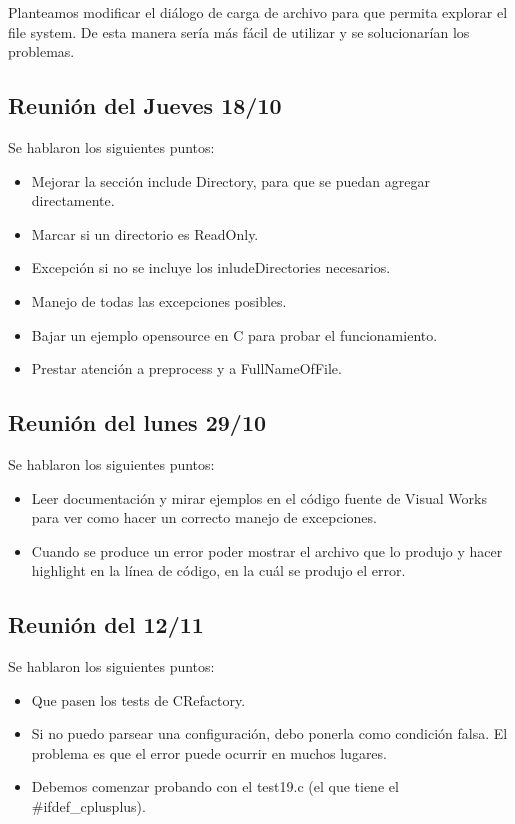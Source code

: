 \documentclass[a4paper,oneside,10pt]{article}
\begin{document}
Planteamos modificar el di\'alogo de carga de archivo para que permita explorar el file system. De esta manera ser\'ia m\'as f\'acil de utilizar y se solucionar\'ian los problemas.

\subsection{Reuni\'on del Jueves 18/10}
Se hablaron los siguientes puntos:
\begin{itemize}
 \item Mejorar la secci\'on include Directory, para que se puedan agregar directamente.
 \item Marcar si un directorio es ReadOnly.
 \item Excepción si no se incluye los inludeDirectories necesarios. 
 \item Manejo de todas las excepciones posibles.
 \item Bajar un ejemplo opensource en C para probar el funcionamiento.
 \item Prestar atenci\'on a preprocess y a FullNameOfFile.
\end{itemize}

\subsection{Reuni\'on del lunes 29/10}
Se hablaron los siguientes puntos:
\begin{itemize}
 \item Leer documentación y mirar ejemplos en el c\'odigo fuente de Visual Works para ver como hacer un correcto manejo de excepciones.
 \item Cuando se produce un error poder mostrar el archivo que lo produjo y hacer highlight en la línea de c\'odigo, en la cu\'al se produjo el error.
\end{itemize}

\subsection{Reuni\'on del 12/11}
Se hablaron los siguientes puntos:
\begin{itemize}
\item Que pasen los tests de CRefactory.
\item Si no puedo parsear una configuraci\'on, debo ponerla como condici\'on falsa.  El problema es que el error puede ocurrir en muchos lugares.
\item Debemos comenzar probando con el test19.c (el que tiene el \#ifdef\_cplusplus).
\end{itemize}
\end{document}
